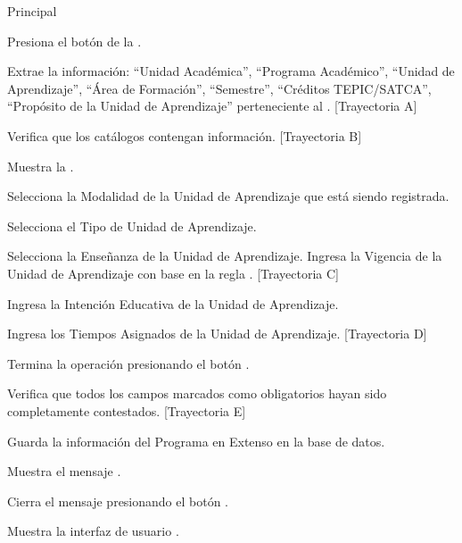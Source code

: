 \begin{UCtrayectoria}{Principal}

	\UCpaso[\UCactor] Presiona el botón  de la .
	
	\UCpaso Extrae la información: ``Unidad Académica'', ``Programa Académico'', ``Unidad de Aprendizaje'', ``Área de Formación'', ``Semestre'', ``Créditos TEPIC/SATCA'', ``Propósito de la Unidad de Aprendizaje'' perteneciente al . [Trayectoria A]
	
	\UCpaso Verifica que los catálogos contengan información. [Trayectoria B]
	
	\UCpaso Muestra la . 
	
	\UCpaso[\UCactor] Selecciona la Modalidad de la Unidad de Aprendizaje que está siendo registrada. %
	
	\UCpaso[\UCactor] Selecciona el Tipo de Unidad de Aprendizaje. %
	
	\UCpaso[\UCactor] Selecciona la Enseñanza de la Unidad de Aprendizaje. %
	\UCpaso[\UCactor] Ingresa la Vigencia de la Unidad de Aprendizaje con base en la regla . [Trayectoria C]
	
	\UCpaso[\UCactor] Ingresa la Intención Educativa de la Unidad de Aprendizaje.
	
	\UCpaso[\UCactor] Ingresa los Tiempos Asignados de la Unidad de Aprendizaje. [Trayectoria D]
	
	\UCpaso[\UCactor] Termina la operación presionando el botón .
        
    \UCpaso Verifica que todos los campos marcados como obligatorios hayan sido completamente contestados. [Trayectoria E]
    
    \UCpaso Guarda la información del Programa en Extenso en la base de datos.
    
    \UCpaso Muestra el mensaje .
    
    \UCpaso[\UCactor] Cierra el mensaje presionando el botón .
    
    \UCpaso Muestra la interfaz de usuario .
\end{UCtrayectoria}


